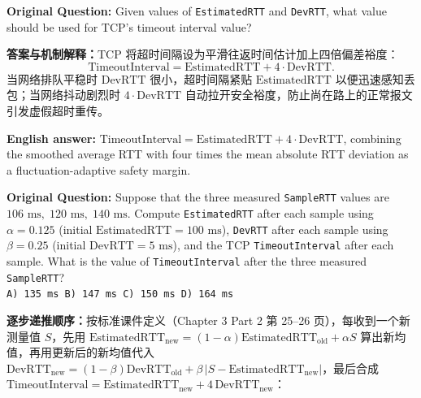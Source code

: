 \textbf{Original Question:} Given values of \texttt{EstimatedRTT} and \texttt{DevRTT}, what value should be used for TCP's timeout interval value?

\textbf{答案与机制解释：}TCP 将超时间隔设为平滑往返时间估计加上四倍偏差裕度：
\[
\mathrm{TimeoutInterval} = \mathrm{EstimatedRTT} + 4 \cdot \mathrm{DevRTT}.
\tag{T6.1}
\]
当网络排队平稳时 $\mathrm{DevRTT}$ 很小，超时间隔紧贴 $\mathrm{EstimatedRTT}$ 以便迅速感知丢包；当网络抖动剧烈时 $4\cdot\mathrm{DevRTT}$ 自动拉开安全裕度，防止尚在路上的正常报文引发虚假超时重传。

\textbf{English answer:} $\mathrm{TimeoutInterval} = \mathrm{EstimatedRTT} + 4\cdot\mathrm{DevRTT}$, combining the smoothed average RTT with four times the mean absolute RTT deviation as a fluctuation-adaptive safety margin.



\textbf{Original Question:} Suppose that the three measured \texttt{SampleRTT} values are $106\text{ ms},\; 120\text{ ms},\; 140\text{ ms}$. Compute \texttt{EstimatedRTT} after each sample using $\alpha = 0.125$ (initial $\mathrm{EstimatedRTT} = 100\text{ ms}$), \texttt{DevRTT} after each sample using $\beta = 0.25$ (initial $\mathrm{DevRTT} = 5\text{ ms}$), and the TCP \texttt{TimeoutInterval} after each sample. What is the value of \texttt{TimeoutInterval} after the three measured \texttt{SampleRTT}? \\
\texttt{A) 135 ms \quad B) 147 ms \quad C) 150 ms \quad D) 164 ms}

\textbf{逐步递推顺序：}按标准课件定义（Chapter 3 Part 2 第 25–26 页），每收到一个新测量值 $S$，先用 $\mathrm{EstimatedRTT}_{\mathrm{new}} = (1-\alpha)\mathrm{EstimatedRTT}_{\mathrm{old}} + \alpha S$ 算出新均值，再用更新后的新均值代入 $\mathrm{DevRTT}_{\mathrm{new}} = (1-\beta)\mathrm{DevRTT}_{\mathrm{old}} + \beta\,|S - \mathrm{EstimatedRTT}_{\mathrm{new}}|$，最后合成 $\mathrm{TimeoutInterval} = \mathrm{EstimatedRTT}_{\mathrm{new}} + 4\,\mathrm{DevRTT}_{\mathrm{new}}$：

